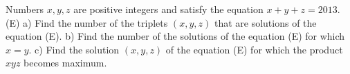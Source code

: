 Numbers $x,y,z$ are positive integers and satisfy the equation $x+y+z=2013$. (E)
a) Find the number of the triplets $(x,y,z)$ that are solutions of the equation (E).
b) Find the number of the solutions of the equation (E) for which $x=y$.
c) Find the solution $(x,y,z)$  of the equation (E) for which the product $xyz$ becomes maximum.